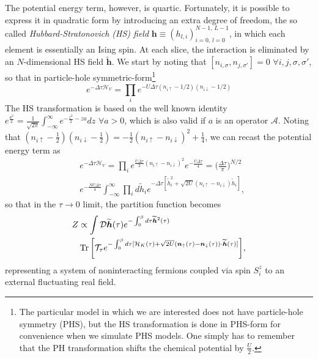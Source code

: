 The potential energy term, however, is quartic.
Fortunately, it is possible to express it in quadratic form by introducing an extra degree of freedom, the so called \emph{Hubbard-Stratonovich (HS) field} $\bm h \equiv (h_{l, i})_{i=0,\, l= 0}^{N-1, \, L - 1}$, in which each element is essentially an Ising spin.
At each slice, the interaction is eliminated by an $N$-dimensional HS field $\widetilde{\bm h}$.
We start by noting that $[ n_{i,\sigma} , n_{j,\sigma'} ] = 0 \,\, \forall i, j, \sigma, \sigma'$, so that in particle-hole symmetric-form\footnote{The particular model in which we are interested does not have particle-hole symmetry (PHS), but the HS transformation is done in PHS-form for convenience when we simulate PHS models.
One simply has to remember that the PH transformation shifts the chemical potential by $\frac{U}{2}$.}
\begin{equation}\label{eq:Hint}
e^{-\Delta\tau \mathcal{H}_V} = \prod_i e^{-U \Delta\tau (n_{i\uparrow} - 1/2 ) (n_{i\downarrow} - 1/2 )}
\end{equation}
The HS transformation is based on the well known identity 
$
e^{ \frac{a^2}{2}} = \frac{1}{\sqrt{2\pi}} \int_{-\infty}^{\infty} e^{-\frac{z^2}{2}  - za } dz
$ 
$ \forall a > 0$, 
which is also valid if $a$ is an operator $\mathcal{A}$.
Noting that $(n_{i\uparrow} - \frac{1}{2} ) (n_{i\downarrow} - \frac{1}{2} ) = -\frac{1}{2} ( n_{i\uparrow} - n_{i\downarrow} )^2 + \frac{1}{4}$, we can recast the potential energy term as
\begin{equation}\label{eq:gaussianForm}
\begin{split}
&e^{-\Delta\tau \mathcal{H}_V} = \prod_i e^{ \frac{U \Delta \tau}{2} ( n_{i\uparrow} - n_{i\downarrow} )^2 } e^{- \frac{U \Delta \tau}{4}} = \bigg(\frac{\Delta \tau}{\pi} \bigg)^{N/2} \\
& e^{- \frac{N U \Delta \tau}{4}} \int_{-\infty}^\infty \prod_i d \widetilde{h}_i e^{-\Delta \tau [ \widetilde{h}_i^2 + \sqrt{2U} ( n_{i\uparrow} - n_{i\downarrow} ) \widetilde{h}_i ]} ,
\end{split}
\end{equation}
so that in the $\tau \rightarrow 0$ limit, the partition function becomes
\begin{equation}
\begin{split}
Z &\propto \int \mathcal{D} \widetilde{\bm h} ( \tau) e^{-\int_0^\beta d\tau \widetilde{\bm h}^2 ( \tau ) } \\
 &\operatorname{Tr} \bigg[ \mathcal{T}_\tau e^{ -\int_0^\beta d\tau [ \mathcal{H}_K ( \tau ) + \sqrt{2U} ( \bm n_{\uparrow} (\tau) - \bm n_{\downarrow} (\tau ) ) \cdot \widetilde{\bm h}(\tau) ] } \bigg] ,
\end{split}
\end{equation}
representing a system of noninteracting fermions coupled via spin $S^z_i$ to an external fluctuating real field.

